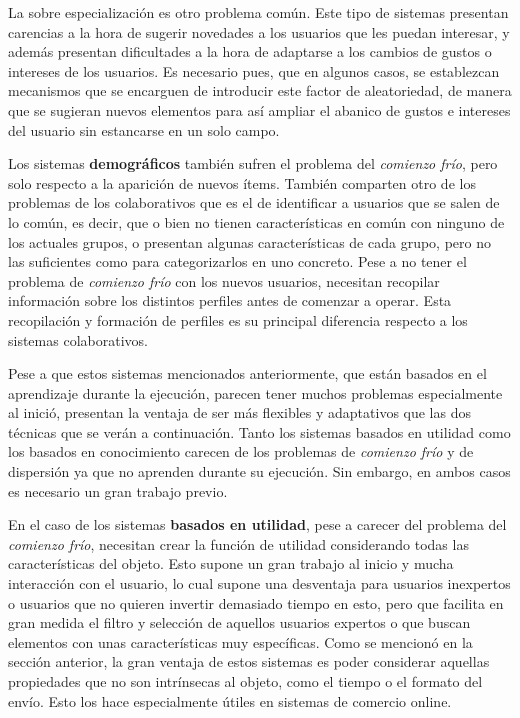 La sobre especialización es otro problema común. Este tipo de sistemas presentan carencias a la hora de sugerir novedades a los usuarios que les puedan interesar, y además presentan dificultades a la hora de adaptarse a los cambios de gustos o intereses de los usuarios. Es necesario pues, que en algunos casos, se establezcan mecanismos que se encarguen de introducir este factor de aleatoriedad, de manera que se sugieran nuevos elementos para así ampliar el abanico de gustos e intereses del usuario sin estancarse en un solo campo.

Los sistemas \textbf{demográficos} también sufren el problema del \textit{comienzo frío}, pero solo respecto a la aparición de nuevos ítems. También comparten otro de los problemas de los colaborativos que es el de identificar a usuarios que se salen de lo común, es decir, que o bien no tienen características en común con ninguno de los actuales grupos, o presentan algunas características de cada grupo, pero no las suficientes como para categorizarlos en uno concreto. Pese a no tener el problema de \textit{comienzo frío} con los nuevos usuarios, necesitan recopilar información sobre los distintos perfiles antes de comenzar a operar. Esta recopilación y formación de perfiles es su principal diferencia respecto a los sistemas colaborativos.

Pese a que estos sistemas mencionados anteriormente, que están basados en el aprendizaje durante la ejecución, parecen tener muchos problemas especialmente al inició, presentan la ventaja de ser más flexibles y adaptativos que las dos técnicas que se verán a continuación. Tanto los sistemas basados en utilidad como los basados en conocimiento carecen de los problemas de \textit{comienzo frío} y de dispersión ya que no aprenden durante su ejecución. Sin embargo, en ambos casos es necesario un gran trabajo previo.

En el caso de los sistemas \textbf{basados en utilidad}, pese a carecer del problema del \textit{comienzo frío}, necesitan crear la función de utilidad considerando todas las características del objeto. Esto supone un gran trabajo al inicio y mucha interacción con el usuario, lo cual supone una desventaja para usuarios inexpertos o usuarios que no quieren invertir demasiado tiempo en esto, pero que facilita en gran medida el filtro y selección de aquellos usuarios expertos o que buscan elementos con unas características muy específicas. Como se mencionó en la sección anterior, la gran ventaja de estos sistemas es poder considerar aquellas propiedades que no son intrínsecas al objeto, como el tiempo o el formato del envío. Esto los hace especialmente útiles en sistemas de comercio online.

